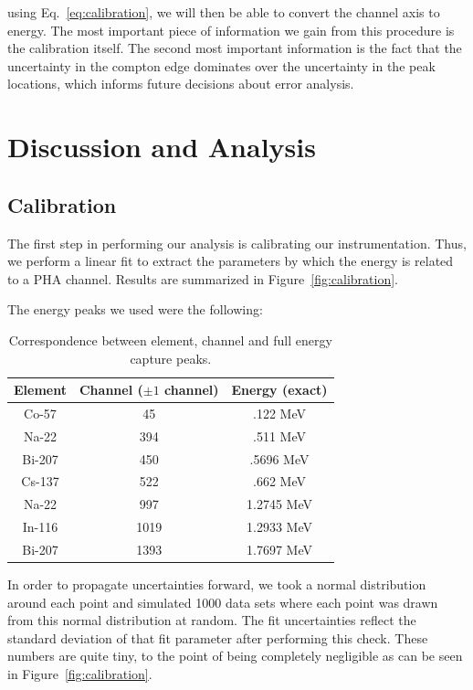\documentclass[reprint, nobibnotes, amssymb, amsmath, amsfonts, physics, mathtools, mathrsfs, floatfix]{revtex4-1}
\begin{document}
      using Eq.~\ref{eq:calibration}, we will then be able to convert the channel axis to energy.  The most important piece of information we gain from this procedure is the calibration itself.  The second most important information is the fact that the uncertainty in the compton edge dominates over the uncertainty in the peak locations, which informs future decisions about error analysis.

  \section{Discussion and Analysis}
    \subsection{Calibration}
      The first step in performing our analysis is calibrating our instrumentation.  Thus, we perform a linear fit to extract the parameters by which the energy is related to a PHA channel.  Results are summarized in Figure~\ref{fig:calibration}.

      The energy peaks we used were the following:

      \begin{table}[h]
        \centering
        \begin{tabular}{|c|c|c|}
          \hline
          Element & Channel ($\pm1$ channel) & Energy (exact) \\ \hline
          Co-57 & 45 & .122 MeV \\ \hline
          Na-22 & 394 & .511 MeV \\ \hline
          Bi-207 & 450 & .5696 MeV \\ \hline
          Cs-137 & 522 & .662 MeV \\ \hline
          Na-22 & 997 & 1.2745 MeV \\ \hline
          In-116 & 1019 & 1.2933 MeV \\ \hline
          Bi-207 & 1393 & 1.7697 MeV \\ \hline
        \end{tabular}
        \caption{Correspondence between element, channel and full energy capture peaks. \label{tab:calibration_points}}
      \end{table}

      In order to propagate uncertainties forward, we took a normal distribution around each point and simulated 1000 data sets where each point was drawn from this normal distribution at random.  The fit uncertainties reflect the standard deviation of that fit parameter after performing this check.  These numbers are quite tiny, to the point of being completely negligible as can be seen in Figure~\ref{fig:calibration}.
\end{document}
